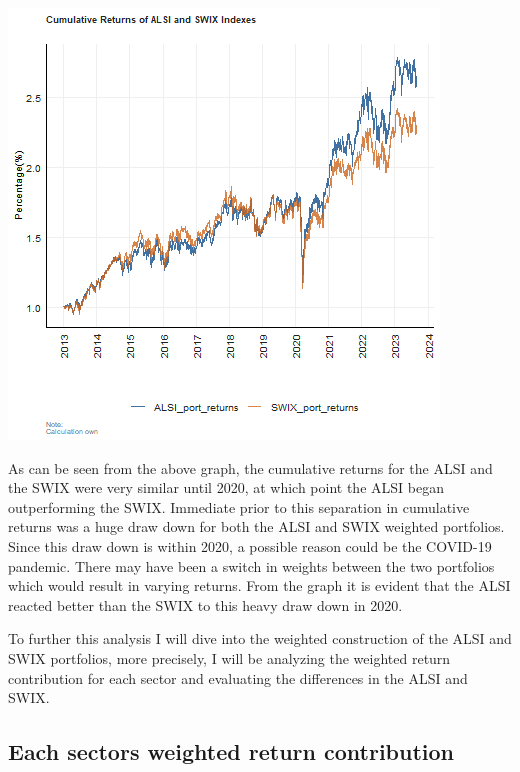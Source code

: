 \documentclass[11pt,preprint, authoryear]{elsarticle}
\let\origfigure\figure
\let\endorigfigure\endfigure
\renewenvironment{figure}[1][2] {
    \expandafter\origfigure\expandafter[H]
} {
    \endorigfigure
}
\numberwithin{equation}{section}
\numberwithin{figure}{section}
\numberwithin{table}{section}
\begin{document}
\begin{figure}[H]

{\centering \includegraphics{Question-3_files/figure-latex/Figure 1-1} 

}

\caption{Cumulative returns plot \label{Figure1}}\label{fig:Figure 1}
\end{figure}

As can be seen from the above graph, the cumulative returns for the ALSI
and the SWIX were very similar until 2020, at which point the ALSI began
outperforming the SWIX. Immediate prior to this separation in cumulative
returns was a huge draw down for both the ALSI and SWIX weighted
portfolios. Since this draw down is within 2020, a possible reason could
be the COVID-19 pandemic. There may have been a switch in weights
between the two portfolios which would result in varying returns. From
the graph it is evident that the ALSI reacted better than the SWIX to
this heavy draw down in 2020.

To further this analysis I will dive into the weighted construction of
the ALSI and SWIX portfolios, more precisely, I will be analyzing the
weighted return contribution for each sector and evaluating the
differences in the ALSI and SWIX.

\hypertarget{each-sectors-weighted-return-contribution}{%
\subsection{Each sectors weighted return
contribution}\label{each-sectors-weighted-return-contribution}}
\end{document}
